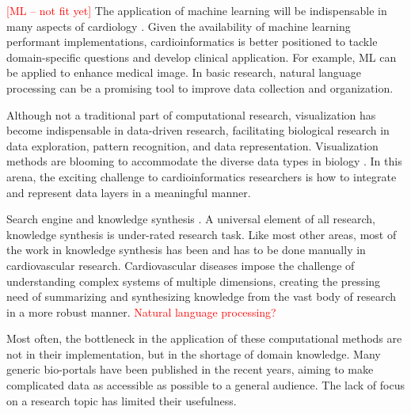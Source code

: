\documentclass[letter]{bioinfo}
\newcommand{\comment}[1]{\textcolor{red}{#1}}
\begin{document}
	
	\comment{[ML -- not fit yet]}
	The application of machine learning will be indispensable in many aspects of cardiology \citep{Shameer:2017:Translational,Shameer:2018:Machine}. Given the availability of machine learning performant implementations, cardioinformatics is better positioned to tackle domain-specific questions and develop clinical application. For example, ML can be applied to enhance medical image. In basic research, natural language processing can be a promising tool to improve data collection and organization.
	
	Although not a traditional part of computational research, visualization has become indispensable in data-driven research, facilitating biological research in data exploration, pattern recognition, and data representation. Visualization methods are blooming to accommodate the diverse data types in biology \citep{Pavlopoulos:2015:Visualizing}. In this arena, the exciting challenge to cardioinformatics researchers is how to integrate and represent data layers in a meaningful manner.
	
	
	Search engine and knowledge synthesis \citep{Lutjohann:2011:Sciencenet}. A universal element of all research, knowledge synthesis is under-rated research task. Like most other areas, most of the work in knowledge synthesis has been and has to be done manually in cardiovascular research. Cardiovascular diseases impose the challenge of understanding complex systems of multiple dimensions, creating the pressing need of summarizing and synthesizing knowledge from the vast body of research in a more robust manner. \comment{Natural language processing?}
	
	
	Most often, the bottleneck in the application of these computational methods are not in their implementation, but in the shortage of domain knowledge. Many generic bio-portals have been published in the recent years, aiming to make complicated data as accessible as possible to a general audience. The lack of focus on a research topic has limited their usefulness.
	
\end{document}
